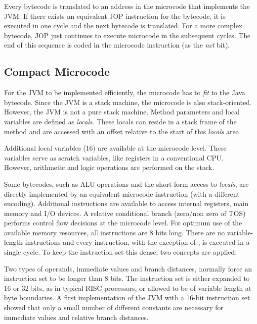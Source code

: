 Every bytecode is translated to an address in the microcode that
implements the JVM. If there exists an equivalent JOP instruction
for the bytecode, it is executed in one cycle and the next bytecode
is translated. For a more complex bytecode, JOP just continues to
execute microcode in the subsequent cycles. The end of this sequence
is coded in the microcode instruction (as the \emph{nxt} bit).


\subsection{Compact Microcode}

For the JVM to be implemented efficiently, the microcode has to
\emph{fit} to the Java bytecode. Since the JVM is a stack machine,
the microcode is also stack-oriented. However, the JVM is not a pure
stack machine. Method parameters and local variables are defined as
\emph{locals}. These locals can reside in a stack frame of the
method and are accessed with an offset relative to the start of this
\emph{locals} area.

Additional local variables (16) are available at the microcode
level. These variables serve as scratch variables, like registers in
a conventional CPU. However, arithmetic and logic operations are
performed on the stack.

Some bytecodes, such as ALU operations and the short form access to
\emph{locals}, are directly implemented by an equivalent microcode
instruction (with a different encoding). Additional instructions are
available to access internal registers, main memory and I/O devices.
A relative conditional branch (zero/non zero of TOS) performs
control flow decisions at the microcode level. For optimum use of
the available memory resources, all instructions are 8 bits long.
There are no variable-length instructions and every instruction,
with the exception of , is executed in a single cycle. To
keep the instruction set this dense, two concepts are applied:

Two types of operands, immediate values and branch distances,
normally force an instruction set to be longer than 8 bits. The
instruction set is either expanded to 16 or 32 bits, as in typical
RISC processors, or allowed to be of variable length at byte
boundaries. A first implementation of the JVM with a 16-bit
instruction set showed that only a small number of different
constants are necessary for immediate values and relative branch
distances.


